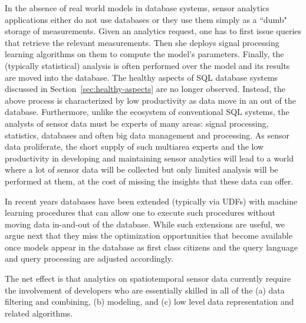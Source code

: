 In the absence of real world models in database systems, sensor analytics applications either do not use databases or they use them simply as a ``dumb" storage of measurements.
Given an analytics request, one has to first issue queries that retrieve the relevant measurements. Then she deploys signal processing learning algorithms on them to compute the model's parameters. Finally,  the (typically statistical) analysis is often performed over the model and its results are moved into the database. 
The healthy aspects of SQL database systems discussed in Section~\ref{sec:healthy-aspects} are no longer observed. Instead, the above process is characterized by low productivity as data move  in an out of the database. Furthermore, unlike the ecosystem of conventional SQL systems, the analysts of sensor data must be experts of many areas: signal processing, statistics, databases and often big data management and processing. As sensor data proliferate, the short supply of such multiarea experts and the low productivity in developing and maintaining sensor analytics will lead to a world where a lot of sensor data will be collected but only limited analysis will be performed at them, at the cost of missing the insights that these data can offer.



In recent years databases have been extended (typically via UDFs) with machine learning procedures that can allow one to execute such procedures without moving data in-and-out of the database. While such extensions are useful, we argue next that they miss the optimization opportunities that become available once models appear in the database as first class citizens and the query language and query processing are adjusted accordingly.

The net effect is that analytics on spatiotemporal sensor data currently require the involvement of developers who are essentially skilled in all of the (a) data filtering and combining, (b) modeling, and (c) low level data representation and related algorithms. 

